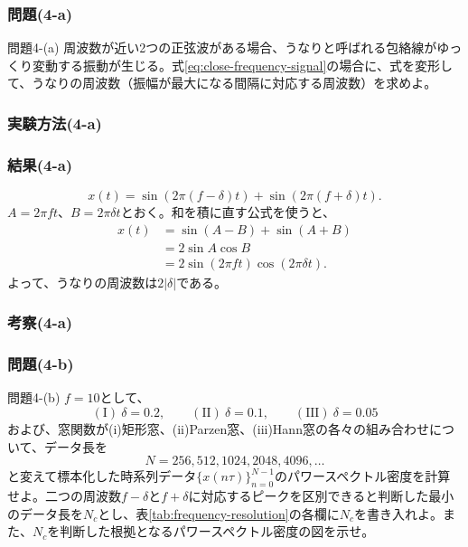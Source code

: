 \documentclass[a4j]{jarticle}
\begin{document}
\subsubsection{問題(4-a)}
\begin{itembox}[l]{問題4-(a)}
周波数が近い2つの正弦波がある場合、うなりと呼ばれる包絡線がゆっくり変動する振動が生じる。式\eqref{eq:close-frequency-signal}の場合に、式を変形して、うなりの周波数（振幅が最大になる間隔に対応する周波数）を求めよ。
\end{itembox}

\subsubsection{実験方法(4-a)}

\subsubsection{結果(4-a)}
\[
  x(t)=\sin\left(2\pi(f-\delta)t\right)
      +\sin\left(2\pi(f+\delta)t\right).
\]
$A=2\pi ft$、$B=2\pi\delta t$とおく。和を積に直す公式を使うと、
\[
  \begin{aligned}
    x(t)&=\sin(A-B)+\sin(A+B)\\
        &=2\sin A\cos B\\
        &=2\sin(2\pi ft)\cos(2\pi\delta t).
  \end{aligned}
\]
よって、うなりの周波数は$2|\delta|$である。

\subsubsection{考察(4-a)}

\subsubsection{問題(4-b)}
\begin{itembox}[l]{問題4-(b)}
$f=10$として、
\[
  \mathrm{(I)}\ \delta=0.2,\qquad
  \mathrm{(II)}\ \delta=0.1,\qquad
  \mathrm{(III)}\ \delta=0.05
\]
および、窓関数が(i)矩形窓、(ii)Parzen窓、(iii)Hann窓の各々の組み合わせについて、データ長を
\[
  N=256,512,1024,2048,4096,\ldots
\]
と変えて標本化した時系列データ$\{x(n\tau)\}_{n=0}^{N-1}$のパワースペクトル密度を計算せよ。二つの周波数$f-\delta$と$f+\delta$に対応するピークを区別できると判断した最小のデータ長を$N_c$とし、表\ref{tab:frequency-resolution}の各欄に$N_c$を書き入れよ。また、$N_c$を判断した根拠となるパワースペクトル密度の図を示せ。
\end{itembox}
\end{document}
